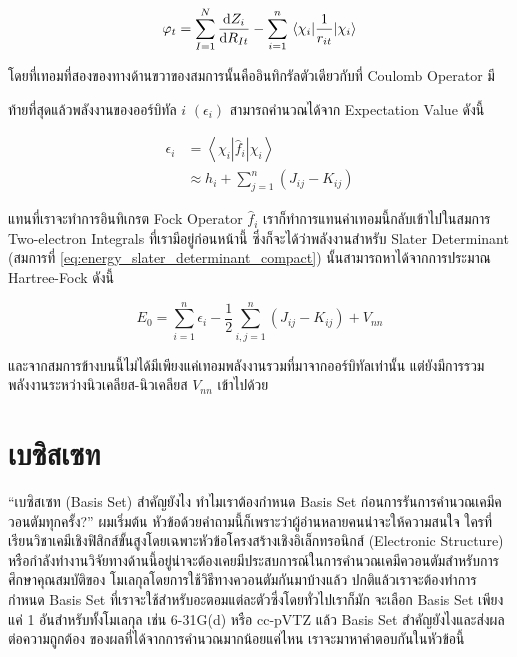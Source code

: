 \begin{equation}
    \varphi_{t} 
    = \sum_{I=1}^{N} \dv{Z_{i}}{R_{It}} 
        - \sum_{i=1}^{n} \mel{\chi_{i}}{\frac{1}{r_{it}}}{\chi_{i}}
\end{equation}

\noindent โดยที่เทอมที่สองของทางด้านขวาของสมการนั้นคืออินทิกรัลตัวเดียวกับที่ Coulomb Operator มี 

ท้ายที่สุดแล้วพลังงานของออร์บิทัล $i$ $(\epsilon_{i})$ สามารถคำนวณได้จาก Expectation Value ดังนี้

\begin{equation}
    \begin{aligned}
        \epsilon_i 
        & = \left\langle\chi_i\left|\hat{f}_i\right| \chi_i\right\rangle \\
        & \approx h_i+\sum_{j=1}^n\left(J_{i j}-K_{i j}\right)
    \end{aligned}
\end{equation}

\noindent แทนที่เราจะทำการอินทิเกรต Fock Operator $\hat{f}_i$ เราก็ทำการแทนค่าเทอมนี้กลับเข้าไปในสมการ Two-electron Integrals
ที่เรามีอยู่ก่อนหน้านี้ ซึ่งก็จะได้ว่าพลังงานสำหรับ Slater Determinant (สมการที่ \ref{eq:energy_slater_determinant_compact}) 
นั้นสามารถหาได้จากการประมาณ Hartree-Fock ดังนี้

\begin{equation}
    E_0 
    = \sum_{i=1}^n \epsilon_i 
        -\frac{1}{2} \sum_{i, j=1}^n\left(J_{i j}-K_{i j}\right) 
        + V_{n n}
\end{equation}

\noindent และจากสมการข้างบนนี้ไม่ได้มีเพียงแค่เทอมพลังงานรวมที่มาจากออร์บิทัลเท่านั้น แต่ยังมีการรวมพลังงานระหว่างนิวเคลียส-นิวเคลียส 
$V_{n n}$ เข้าไปด้วย

\section{เบซิสเซท}

\enquote{เบซิสเซท (Basis Set) สำคัญยังไง ทำไมเราต้องกำหนด Basis Set ก่อนการรันการคำนวณเคมีควอนตัมทุกครั้ง?} ผมเริ่มต้น%
หัวข้อด้วยคำถามนี้ก็เพราะว่าผู้อ่านหลายคนน่าจะให้ความสนใจ ใครที่เรียนวิชาเคมีเชิงฟิสิกส์ขั้นสูงโดยเฉพาะหัวข้อโครงสร้างเชิงอิเล็กทรอนิกส์ 
(Electronic Structure) หรือกำลังทำงานวิจัยทางด้านนี้อยู่น่าจะต้องเคยมีประสบการณ์ในการคำนวณเคมีควอนตัมสำหรับการศึกษาคุณสมบัติของ%
โมเลกุลโดยการใช้วิธีทางควอนตัมกันมาบ้างแล้ว ปกติแล้วเราจะต้องทำการกำหนด Basis Set ที่เราจะใช้สำหรับอะตอมแต่ละตัวซึ่งโดยทั่วไปเราก็มัก%
จะเลือก Basis Set เพียงแค่ 1 อันสำหรับทั้งโมเลกุล เช่น 6-31G(d) หรือ cc-pVTZ แล้ว Basis Set สำคัญยังไงและส่งผลต่อความถูกต้อง%
ของผลที่ได้จากการคำนวณมากน้อยแค่ไหน เราจะมาหาคำตอบกันในหัวข้อนี้

